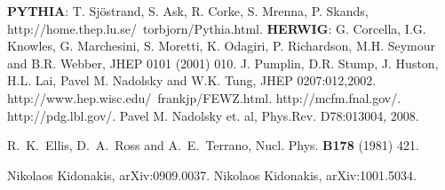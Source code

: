 \documentclass{cmspaper_pdf}
\begin{document}
\begin{thebibliography}{9}

 \textbf{PYTHIA}: T. Sj\"ostrand, S. Ask, R. Corke, S. Mrenna, 
P. Skands, http://home.thep.lu.se/~torbjorn/Pythia.html.
 \textbf{HERWIG}: G. Corcella, I.G. Knowles, G. Marchesini, 
S. Moretti, K. Odagiri, P. Richardson, M.H. Seymour and B.R. Webber, 
JHEP 0101 (2001) 010.
 J. Pumplin, D.R. Stump, J. Huston, H.L. Lai, 
Pavel M. Nadolsky and W.K. Tung, JHEP 0207:012,2002. 
http://www.hep.wisc.edu/~frankjp/FEWZ.html.
http://mcfm.fnal.gov/.
http://pdg.lbl.gov/.
 Pavel M. Nadolsky et. al, Phys.Rev. D78:013004, 2008. 

 R.~K.~Ellis, D.~A.~Ross and A.~E.~Terrano, Nucl. Phys. {\bf B178} (1981) 421.

 Nikolaos Kidonakis, arXiv:0909.0037.
 Nikolaos Kidonakis, arXiv:1001.5034.

 
\end{thebibliography}
\end{document}
